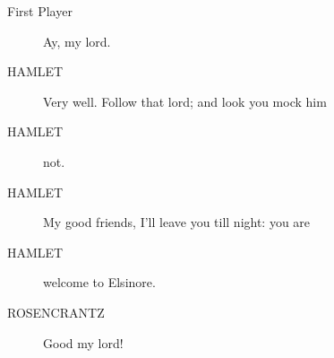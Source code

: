 \documentclass{article}
\begin{document}
\begin{description}
            
\item[First Player] Ay, my lord.
\end{description}
          
\begin{description}
            
\item[HAMLET] Very well. Follow that lord; and look you mock him
\item[HAMLET] not.
\item[HAMLET] My good friends, I'll leave you till night: you are
\item[HAMLET] welcome to Elsinore.
\end{description}
          
\begin{description}
            
\item[ROSENCRANTZ] Good my lord!
\end{description}
          
\end{document}
